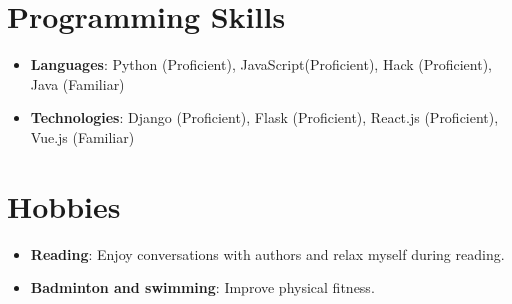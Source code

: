\documentclass[letterpaper,11pt]{article}
\newcommand{\resumeItem}[2]{
  \item\small{
    \textbf{#1}{: #2 \vspace{-2pt}}
  }
}
\newcommand{\resumeSubItem}[2]{\resumeItem{#1}{#2}\vspace{-4pt}}
\newcommand{\resumeSubHeadingListStart}{\begin{itemize}[leftmargin=*]}
\newcommand{\resumeSubHeadingListEnd}{\end{itemize}}
\begin{document}
\section{Programming Skills}
  \resumeSubHeadingListStart
    \resumeSubItem{Languages}
    {Python (Proficient), JavaScript(Proficient), Hack (Proficient), Java (Familiar)}
    \resumeSubItem{Technologies}
    {Django (Proficient), Flask (Proficient), React.js (Proficient), Vue.js (Familiar)}
 \resumeSubHeadingListEnd

\section{Hobbies}
  \resumeSubHeadingListStart
    \resumeSubItem{Reading}
    {Enjoy conversations with authors and relax myself during reading.}
    \resumeSubItem{Badminton and swimming} 
    {Improve physical fitness. }
 \resumeSubHeadingListEnd


\end{document}
